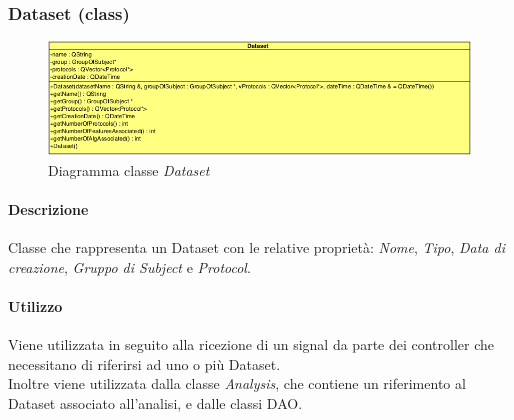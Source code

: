 \pagebreak
\color{black}
\subsubsection{Dataset (class)}
\label{Dataset}
\begin{figure}[!h]
\centering
			\includegraphics[scale=0.7]{./Content/Immagini/modelCore/Dataset.png}
			\caption{Diagramma classe \textsl{Dataset}}
			\label{Dataset_img}
\end{figure}

\paragraph{Descrizione \\}
Classe che rappresenta un Dataset\g{} con le relative proprietà: \textit{Nome}, \textit{Tipo}, \textit{Data di creazione}, \textit{Gruppo di Subject\g{}} e \textit{Protocol\g{}}.

\paragraph{Utilizzo \\}
Viene utilizzata in seguito alla ricezione di un signal\g{} da parte dei controller che necessitano di riferirsi ad uno o più Dataset\g{}.			
\\Inoltre viene utilizzata dalla classe \textsl{Analysis}, che contiene un riferimento al Dataset\g{} associato all'analisi, e dalle classi DAO.

